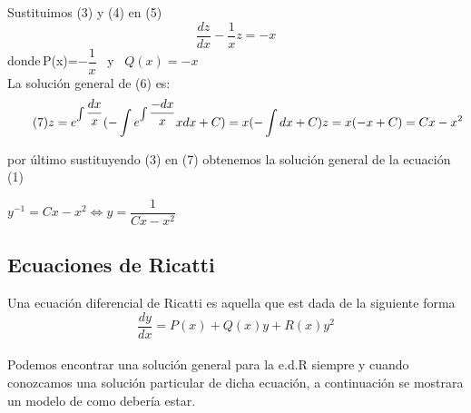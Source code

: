 \documentclass[10pt,a4paper]{article}
\begin{document}
Sustituimos (3) y (4) en (5) 
\begin{equation}\tag{6}
\dfrac{dz}{dx}-\dfrac{1}{x}z=-x
\end{equation}
donde\,P(x)=$-\dfrac{1}{x}$ \, y \, $Q(x)=-x$\\

La solución general de (6) es:
\begin{equation}\tag{7}
z= e^{\int{\dfrac{dx}{x}}} (-\int e^{\int{\dfrac{-dx}{x}}}xdx+C)=x(-\int{dx+C})
z=x(-x+C)=Cx-x^2\\
\end{equation}

por último sustituyendo (3) en (7) obtenemos la solución general de la ecuación (1)
\begin{center}
$y^{-1}=Cx-x^{2}\Leftrightarrow y=\dfrac{1}{Cx-x^{2}}$

\end{center}
  
  \subsection{Ecuaciones de Ricatti}
  
  Una ecuación diferencial de Ricatti es aquella que est dada de la siguiente forma\\
$$\dfrac{dy}{dx}=P(x)+Q(x)y+R(x)y^2$$\\
Podemos encontrar una solución general para la e.d.R siempre y cuando conozcamos una solución particular de dicha ecuación, a continuación se mostrara un modelo de como debería estar.\\
\end{document}
